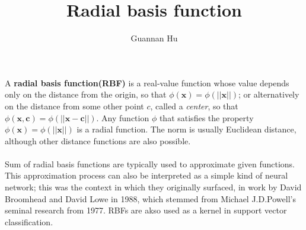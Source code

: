 \documentclass[12pt,a4paper]{article}
\begin{document}
\title{Radial basis function}
\author{Guannan Hu}
\maketitle

\paragraph{}A \textbf{radial basis function(RBF)} is a real-value function whose value depends only on the distance from the origin, so that $\phi(\bm{x}) = \phi(||\bm{x}||)$; or alternatively on the distance from some other point $c$, called a \textit{center}, so that $\phi(\bm{x}, \bm{c}) = \phi(||\bm{x} - \bm{c}||)$. Any function $\phi$ that satisfies the property $\phi(\bm{x})=\phi(||\bm{x}||)$ is a radial function. The norm is usually Euclidean distance, although other distance functions are also possible.
\paragraph{} Sum of radial basis functions are typically used to approximate given functions. This approximation process can also be interpreted as a simple kind of neural network; this was the context in which they originally surfaced, in work by David Broomhead and David Lowe in 1988, which stemmed from Michael J.D.Powell's seminal research from 1977. RBFs are akso used as a kernel in support vector classification.



\end{document}
